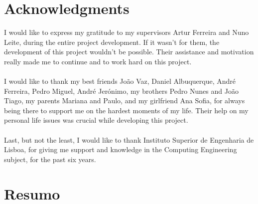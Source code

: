 \chapter*{Acknowledgments}

I would like to express my gratitude to my supervisors Artur Ferreira and Nuno Leite, during the entire project development. If it wasn't for them, the development of this project wouldn't be possible. Their assistance and motivation really made me to continue and to work hard on this project.\\
\\
I would like to thank my best friends João Vaz, Daniel Albuquerque, André Ferreira, Pedro Miguel, André Jerónimo, my brothers Pedro Nunes and João Tiago, my parents Mariana and Paulo, and my girlfriend Ana Sofia, for always being there to support me on the hardest moments of my life. Their help on my personal life issues was crucial while developing this project.\\
\\
Last, but not the least, I would like to thank Instituto Superior de Engenharia de Lisboa, for giving me support and knowledge in the Computing Engineering subject, for the past six years.
\
\chapter*{Resumo}

